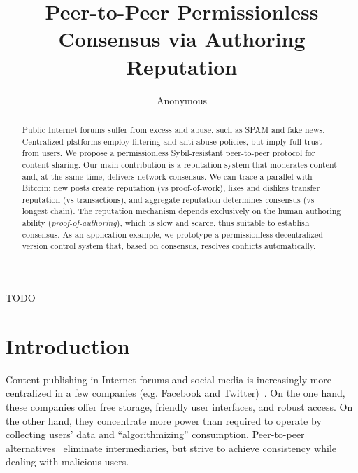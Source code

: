 \documentclass[12pt]{article}
\title{
    Peer-to-Peer Permissionless Consensus via Authoring Reputation
}
\author{Anonymous}
\begin{document}
\maketitle

\begin{abstract}
Public Internet forums suffer from excess and abuse, such as SPAM and fake
news.
Centralized platforms employ filtering and anti-abuse policies, but imply full
trust from users.
%
We propose a permissionless Sybil-resistant peer-to-peer protocol for content
sharing. %
Our main contribution is a reputation system that moderates content and, at the
same time, delivers network consensus.
We can trace a parallel with Bitcoin:
    new posts create reputation (vs proof-of-work),
    likes and dislikes transfer reputation (vs transactions),
    and aggregate reputation determines consensus (vs longest chain).
%
The reputation mechanism depends exclusively on the human authoring ability
(\emph{proof-of-authoring}), which is slow and scarce, thus suitable to
establish consensus.
As an application example, we prototype a permissionless decentralized version
control system that, based on consensus, resolves conflicts automatically.
\end{abstract}

\begin{resumo} 
TODO
\end{resumo}

\section{Introduction}
\label{sec.introduction}

Content publishing in Internet forums and social media is
increasingly more centralized in a few companies (e.g. Facebook and
Twitter)~\cite{internet.fixing,p2p.osn,p2p.dosn}.
On the one hand, these companies offer free storage, friendly user interfaces,
and robust access.
On the other hand, they concentrate more power than required to operate by
collecting users' data and ``algorithmizing'' consumption.
%
Peer-to-peer alternatives~\cite{p2p.survey} eliminate intermediaries, but
strive to achieve consistency while dealing with malicious users.
\end{document}

